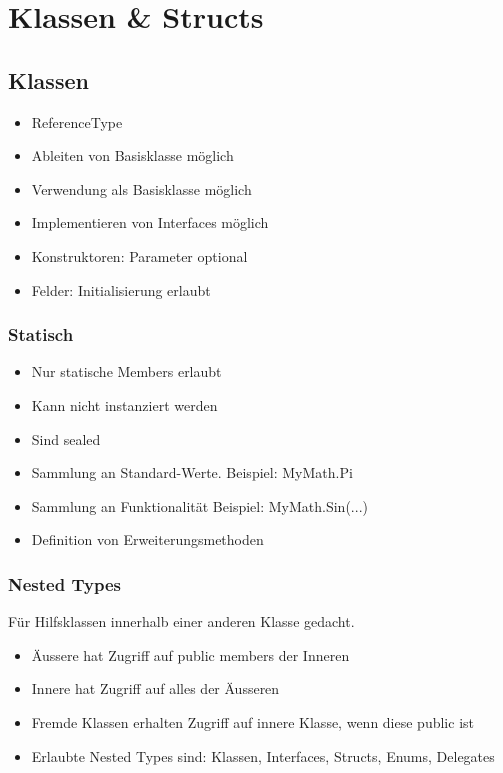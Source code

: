 
\section{Klassen \& Structs}
\begin{multicols*}{2}
\subsection{Klassen}
\begin{itemize}
    \item ReferenceType
    \item Ableiten von Basisklasse möglich
    \item Verwendung als Basisklasse möglich
    \item Implementieren von Interfaces möglich
    \item Konstruktoren: Parameter optional
    \item Felder: Initialisierung erlaubt
\end{itemize}
\subsubsection{Statisch}
\begin{itemize}
    \item Nur statische Members erlaubt
    \item Kann nicht instanziert werden
    \item Sind sealed
\end{itemize}
\begin{itemize}
    \item Sammlung an Standard-Werte. Beispiel: MyMath.Pi
    \item Sammlung an Funktionalität Beispiel: MyMath.Sin(...)
    \item Definition von Erweiterungsmethoden
\end{itemize}
\subsubsection{Nested Types}
Für Hilfsklassen innerhalb einer anderen Klasse gedacht.
\begin{itemize}
    \item Äussere hat Zugriff auf public members der Inneren
    \item Innere hat Zugriff auf alles der Äusseren
    \item Fremde Klassen erhalten Zugriff auf innere Klasse, wenn diese public ist
    \item Erlaubte Nested Types sind: Klassen, Interfaces, Structs, Enums, Delegates
\end{itemize}


\end{multicols*}
